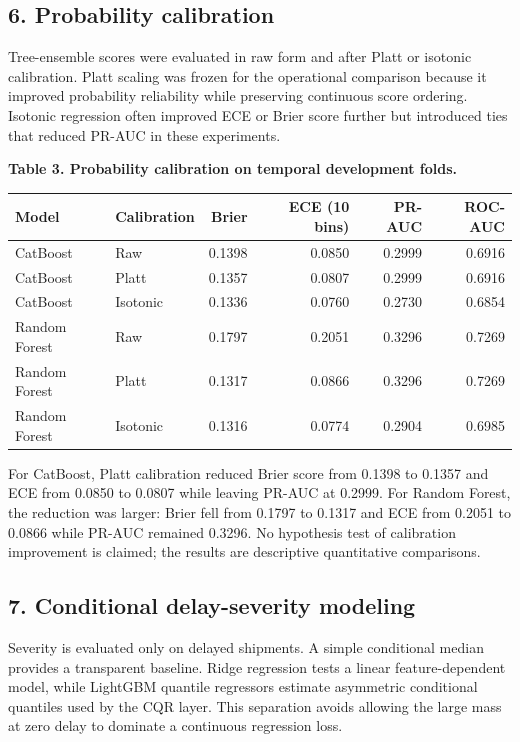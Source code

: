 \documentclass[
]{article}
\begin{document}
\subsection{6. Probability calibration}\label{probability-calibration}

Tree-ensemble scores were evaluated in raw form and after Platt or
isotonic calibration. Platt scaling was frozen for the operational
comparison because it improved probability reliability while preserving
continuous score ordering. Isotonic regression often improved ECE or
Brier score further but introduced ties that reduced PR-AUC in these
experiments.

\textbf{Table 3. Probability calibration on temporal development folds.}

\begin{longtable}[]{@{}llrrrr@{}}
\toprule\noalign{}
Model & Calibration & Brier & ECE (10 bins) & PR-AUC & ROC-AUC \\
\midrule\noalign{}
\endhead
\bottomrule\noalign{}
\endlastfoot
CatBoost & Raw & 0.1398 & 0.0850 & 0.2999 & 0.6916 \\
CatBoost & Platt & 0.1357 & 0.0807 & 0.2999 & 0.6916 \\
CatBoost & Isotonic & 0.1336 & 0.0760 & 0.2730 & 0.6854 \\
Random Forest & Raw & 0.1797 & 0.2051 & 0.3296 & 0.7269 \\
Random Forest & Platt & 0.1317 & 0.0866 & 0.3296 & 0.7269 \\
Random Forest & Isotonic & 0.1316 & 0.0774 & 0.2904 & 0.6985 \\
\end{longtable}

For CatBoost, Platt calibration reduced Brier score from 0.1398 to
0.1357 and ECE from 0.0850 to 0.0807 while leaving PR-AUC at 0.2999. For
Random Forest, the reduction was larger: Brier fell from 0.1797 to
0.1317 and ECE from 0.2051 to 0.0866 while PR-AUC remained 0.3296. No
hypothesis test of calibration improvement is claimed; the results are
descriptive quantitative comparisons.

\subsection{7. Conditional delay-severity
modeling}\label{conditional-delay-severity-modeling}

Severity is evaluated only on delayed shipments. A simple conditional
median provides a transparent baseline. Ridge regression tests a linear
feature-dependent model, while LightGBM quantile regressors estimate
asymmetric conditional quantiles used by the CQR layer. This separation
avoids allowing the large mass at zero delay to dominate a continuous
regression loss.
\end{document}
